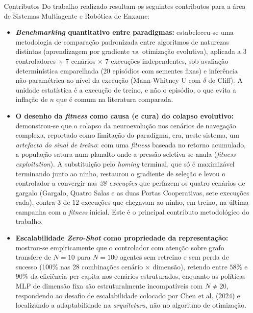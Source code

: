 \documentclass[12pt,reqno, twoside]{amsbook}
\makeatletter
\def\section{\@startsection{section}{1}%
      \z@{.5\linespacing\@plus.7\linespacing}{.25\linespacing}%
      {\normalfont\bfseries\flushleft}}
\theoremstyle{plain}
\numberwithin{equation}{chapter}
\numberwithin{section}{chapter}
\numberwithin{table}{chapter}
\numberwithin{figure}{chapter}
\makeatother
\begin{document}
\section{Contributos}
\label{sec:contributos}
Do trabalho realizado resultam os seguintes contributos para a área de Sistemas Multiagente e Robótica de Enxame:
\begin{itemize}
    \item \textbf{\textit{Benchmarking} quantitativo entre paradigmas:} estabeleceu-se uma metodologia de comparação padronizada entre algoritmos de naturezas distintas (aprendizagem por gradiente \textit{vs.} otimização evolutiva), aplicada a 3 controladores $\times$ 7 cenários $\times$ 7 execuções independentes, sob avaliação determinística emparelhada (20 episódios com sementes fixas) e inferência não-paramétrica ao nível da execução (Mann-Whitney U com $\delta$ de Cliff). A unidade estatística é a execução de treino, e não o episódio, o que evita a inflação de $n$ que é comum na literatura comparada.
    \item \textbf{O desenho da \textit{fitness} como causa (e cura) do colapso evolutivo:} demonstrou-se que o colapso da neuroevolução nos cenários de navegação complexa, reportado como limitação do paradigma, era, neste sistema, um \emph{artefacto do sinal de treino}: com uma \textit{fitness} baseada no retorno acumulado, a população satura num planalto onde a pressão seletiva se anula (\textit{fitness exploitation}). A substituição pelo \textit{homing} terminal, que só é maximizável terminando junto ao ninho, restaurou o gradiente de seleção e levou o controlador a convergir nas \emph{28 execuções} que perfazem os quatro cenários de gargalo (Gargalo, Quatro Salas e as duas Portas Cooperativas, sete execuções cada), contra $3$ de $12$ execuções que chegavam ao ninho, em treino, na última campanha com a \textit{fitness} inicial. Este é o principal contributo metodológico do trabalho.
    \item \textbf{Escalabilidade \textit{Zero-Shot} como propriedade da representação:} mostrou-se empiricamente que o controlador com atenção sobre grafo transfere de $N=10$ para $N=100$ agentes sem retreino e sem perda de sucesso (100\% nas 28 combinações cenário $\times$ dimensão), retendo entre $58\%$ e $90\%$ da eficiência per capita nos cenários estruturados, enquanto as políticas MLP de dimensão fixa são estruturalmente incompatíveis com $N \neq 20$, respondendo ao desafio de escalabilidade colocado por Chen et al. (2024) \cite{chen2024graph} e localizando a adaptabilidade na \emph{arquitetura}, não no algoritmo de otimização.

\end{itemize}
\end{document}
